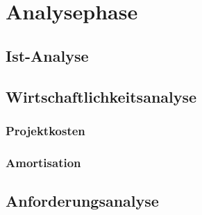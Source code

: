 \section{Analysephase}
\label{sec:Analysephase}

\subsection{Ist-Analyse}
\label{sec:IstAnalyse}


\subsection{Wirtschaftlichkeitsanalyse}
\label{sec:Wirtschaftlichkeitsanalyse}

\subsubsection{Projektkosten}

\subsubsection{Amortisation}

\subsection{Anforderungsanalyse}
\label{sec:Anforderungsanalyse}

